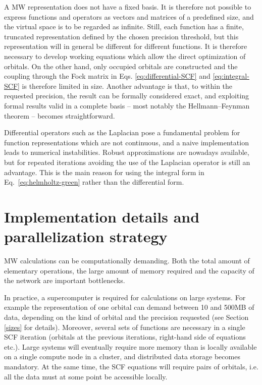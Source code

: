 \documentclass[journal=jctcce, manuscript=article]{achemso}
\begin{document}
A \ac{MW} representation does not have a fixed basis. It is therefore not possible to express functions and operators as vectors and matrices of a predefined size, and the virtual space is to be regarded as infinite. Still, each function has a finite, truncated representation defined by the chosen precision threshold, but this representation will in general be different for different functions. It is therefore necessary to develop working equations which allow the direct optimization of orbitals. On the other hand, only occupied orbitals are constructed and the coupling through the Fock matrix in Eqs. \eqref{eq:differential-SCF} and \eqref{eq:integral-SCF} is therefore limited in size. Another advantage is that, to within the requested precision, the result can be formally considered exact, and exploiting formal results valid in a complete basis -- most notably the Hellmann--Feynman theorem -- becomes straightforward.\cite{Yanai2004-tw}

Differential operators such as the Laplacian pose a fundamental problem for function representations which are not continuous, and a naive implementation leads to numerical instabilities. Robust approximations are nowadays available\cite{Anderson2019-bx}, but for repeated iterations avoiding the use of the Laplacian operator is still an advantage. This is the main reason for using the integral form in Eq.~\eqref{eq:helmholtz-green} rather than the differential form.




%

\section{Implementation details and parallelization strategy}

\ac{MW} calculations can be computationally demanding. Both the total amount of elementary operations, the large amount of memory required and the capacity of the network are important bottlenecks. 

In practice, a supercomputer is required for calculations on large systems.
For example the representation of one orbital can demand between 10 and 500MB of data, depending on the kind of orbital and the precision requested (see Section \ref{sizes} for details). Moreover, several sets of functions are necessary in a single \ac{SCF} iteration (orbitals at the previous iterations, right-hand side of equations etc.). Large systems will eventually require more memory than is locally available on a single compute node in a cluster, and distributed data storage becomes mandatory. At the same time, the \ac{SCF} equations will require pairs of orbitals, i.e. all the data must at some point be accessible locally.
\end{document}
